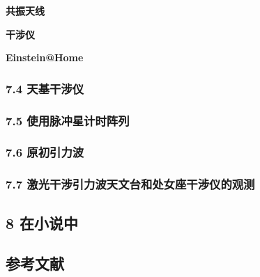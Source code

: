 \textbf{共振天线}

\textbf{干涉仪}

\textbf{Einstein@Home}

\subsubsection{7.4 天基干涉仪}

\subsubsection{7.5 使用脉冲星计时阵列}

\subsubsection{7.6 原初引力波}

\subsubsection{7.7 激光干涉引力波天文台和处女座干涉仪的观测}

\subsection{8 在小说中}

\subsection{参考文献}